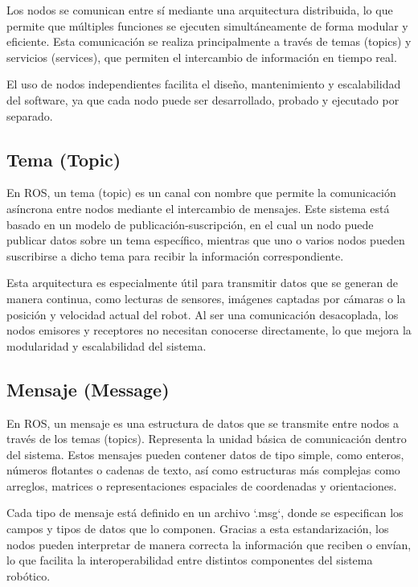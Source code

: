 Los nodos se comunican entre sí mediante una arquitectura distribuida, lo que permite que múltiples funciones se ejecuten simultáneamente de forma modular y eficiente. Esta comunicación se realiza principalmente a través de temas (topics) y servicios (services), que permiten el intercambio de información en tiempo real.

El uso de nodos independientes facilita el diseño, mantenimiento y escalabilidad del software, ya que cada nodo puede ser desarrollado, probado y ejecutado por separado.

\subsection{Tema (Topic)}

En ROS, un tema (topic) es un canal con nombre que permite la comunicación asíncrona entre nodos mediante el intercambio de mensajes. Este sistema está basado en un modelo de publicación-suscripción, en el cual un nodo puede publicar datos sobre un tema específico, mientras que uno o varios nodos pueden suscribirse a dicho tema para recibir la información correspondiente.

Esta arquitectura es especialmente útil para transmitir datos que se generan de manera continua, como lecturas de sensores, imágenes captadas por cámaras o la posición y velocidad actual del robot. Al ser una comunicación desacoplada, los nodos emisores y receptores no necesitan conocerse directamente, lo que mejora la modularidad y escalabilidad del sistema.

\subsection{Mensaje (Message)}

En ROS, un mensaje es una estructura de datos que se transmite entre nodos a través de los temas (topics). Representa la unidad básica de comunicación dentro del sistema. Estos mensajes pueden contener datos de tipo simple, como enteros, números flotantes o cadenas de texto, así como estructuras más complejas como arreglos, matrices o representaciones espaciales de coordenadas y orientaciones.

Cada tipo de mensaje está definido en un archivo `.msg`, donde se especifican los campos y tipos de datos que lo componen. Gracias a esta estandarización, los nodos pueden interpretar de manera correcta la información que reciben o envían, lo que facilita la interoperabilidad entre distintos componentes del sistema robótico.

